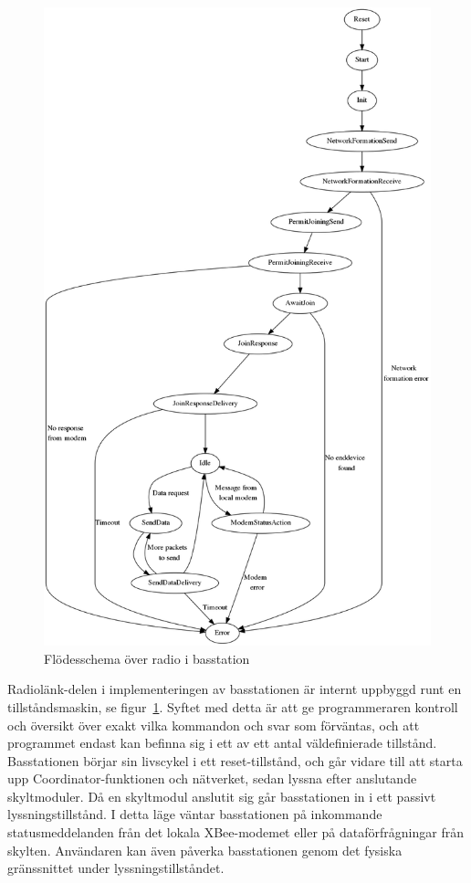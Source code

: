 \documentclass[a4paper,11pt]{article}
\begin{document}
\begin{figure}[H]
\begin{center}
\includegraphics[scale=0.3, angle=0]{basFSM.png}
\end{center}
\caption{Flödesschema över radio i basstation}
\label{fig:radio_bas}
\end{figure}

Radiolänk-delen i implementeringen av basstationen är internt uppbyggd runt en tillståndsmaskin, se figur~\ref{fig:radio_bas}. Syftet med detta är att ge programmeraren kontroll och översikt över exakt vilka kommandon och svar som förväntas, och att programmet endast kan befinna sig i ett av ett antal väldefinierade tillstånd. Basstationen börjar sin livscykel i ett reset-tillstånd, och går vidare till att starta upp Coordinator-funktionen och nätverket, sedan lyssna efter anslutande skyltmoduler. Då en skyltmodul anslutit sig går basstationen in i ett passivt lyssningstillstånd. I detta läge väntar basstationen på inkommande statusmeddelanden från det lokala XBee-modemet eller på dataförfrågningar från skylten. Användaren kan även påverka basstationen genom det fysiska gränssnittet under lyssningstillståndet. \\
\end{document}

